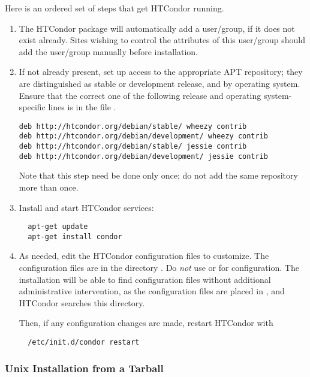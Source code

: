 Here is an ordered set of steps that get HTCondor running.
\begin{enumerate}
\item The HTCondor package will automatically add a  user/group,
if it does not exist already.
Sites wishing to control the attributes of this user/group 
should add the  user/group manually before installation.

\item If not already present,
set up access to the appropriate APT repository;
they are distinguished as stable or development release,
and by operating system. 
Ensure that the correct one of the following release and 
operating system-specific lines is in 
the file  .
\footnotesize
\begin{verbatim}
deb http://htcondor.org/debian/stable/ wheezy contrib
deb http://htcondor.org/debian/development/ wheezy contrib
deb http://htcondor.org/debian/stable/ jessie contrib
deb http://htcondor.org/debian/development/ jessie contrib
\end{verbatim}
\normalsize
Note that this step need be done only once;
do not add the same repository more than once.

\item Install and start HTCondor services:
\begin{verbatim}
  apt-get update
  apt-get install condor
\end{verbatim}

\item As needed, edit the HTCondor configuration files to customize.
The configuration files are in the directory  .
Do \emph{not} use  or  for configuration.
The installation will be able to find configuration files without
additional administrative intervention,
as the configuration files are placed in ,
and HTCondor searches this directory.

Then, if any configuration changes are made, restart HTCondor with
\begin{verbatim}
  /etc/init.d/condor restart
\end{verbatim}

\end{enumerate}

\subsubsection{\label{sec:unix-install-from-tarball}
Unix Installation from a Tarball}

